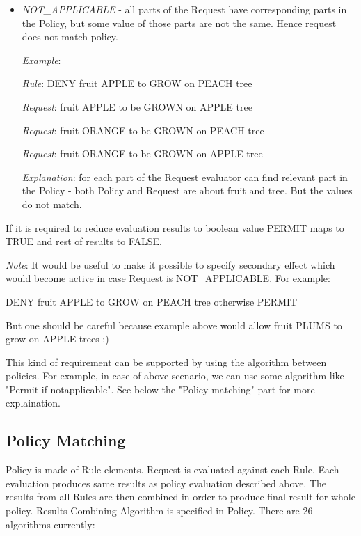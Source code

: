 \documentclass{book}
\begin{document}
\begin{itemize}
    \item  \emph{NOT\_APPLICABLE} - all parts of the Request have corresponding parts in the Policy, but some value of those parts are not the same. Hence request does not match policy.

        \emph{Example}:

            \emph{Rule}: DENY fruit APPLE to GROW on PEACH tree

            \emph{Request}: fruit APPLE to be GROWN on APPLE tree 

            \emph{Request}: fruit ORANGE to be GROWN on PEACH tree 

            \emph{Request}: fruit ORANGE to be GROWN on APPLE tree 

        \emph{Explanation}: for each part of the Request evaluator can find relevant part in the Policy - both Policy and Request are about fruit and tree. But the values do not match.

\end{itemize}

If it is required to reduce evaluation results to boolean value PERMIT maps to TRUE and rest of results to FALSE.

\emph{Note}: It would be useful to make it possible to specify secondary effect which would become active in case Request is NOT\_APPLICABLE. For example:

DENY fruit APPLE to GROW on PEACH tree otherwise PERMIT

But one should be careful because example above would allow fruit PLUMS to grow on APPLE trees :)

This kind of requirement can be supported by using the algorithm between policies.  For example, in case of above scenario, we can use some algorithm like "Permit-if-notapplicable". See below the "Policy matching" part for more explaination.  


\subsection{Policy Matching} %
\label{subsec:poicy_matching}
Policy is made of Rule elements. Request is evaluated against each Rule. Each evaluation produces same results as policy evaluation described above. The results from all Rules are then combined in order to produce final result for whole policy. Results Combining Algorithm is specified in Policy. There are 26 algorithms currently:
\end{document}
